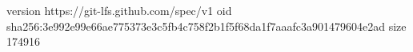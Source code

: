 version https://git-lfs.github.com/spec/v1
oid sha256:3e992e99e66ae775373e3c5fb4c758f2b1f5f68da1f7aaafc3a901479604e2ad
size 174916
